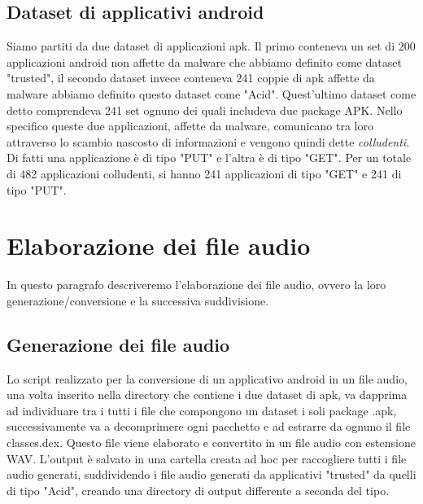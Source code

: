 \subsection{Dataset di applicativi android}
\label{par:datasetApk}
Siamo partiti da due dataset di applicazioni apk. Il primo conteneva un set di 200 applicazioni android non affette da malware che abbiamo definito come dataset "trusted", il secondo dataset invece conteneva 241 coppie di apk affette da malware abbiamo definito questo dataset come "Acid". Quest'ultimo dataset come detto comprendeva 241 set ognuno dei quali includeva due package APK. Nello specifico queste due applicazioni, affette da malware, comunicano tra loro attraverso lo scambio nascosto di informazioni e vengono quindi dette \textit{colludenti}. Di fatti una applicazione è di tipo "PUT" e l'altra è di tipo "GET". Per un totale di 482 applicazioni colludenti, si hanno 241 applicazioni di tipo "GET" e 241 di tipo "PUT".

\section{Elaborazione dei file audio}
In questo paragrafo descriveremo l'elaborazione dei file audio, ovvero la loro generazione/conversione e la successiva suddivisione.

\subsection{Generazione dei file audio}
\label{par:gen}
Lo script realizzato per la conversione di un applicativo android in un file audio, una volta inserito nella directory che contiene i due dataset di apk, va dapprima ad individuare tra i tutti i file che compongono un dataset i soli package .apk, successivamente va a decomprimere ogni pacchetto e ad estrarre da ognuno il file classes.dex. Questo file viene elaborato e  convertito in un file audio con estensione WAV. L'output è salvato in una cartella creata ad hoc per raccogliere tutti i file audio generati,  suddividendo i file audio generati da applicativi "trusted" da quelli di tipo "Acid", creando una directory di output differente a seconda del tipo. 

